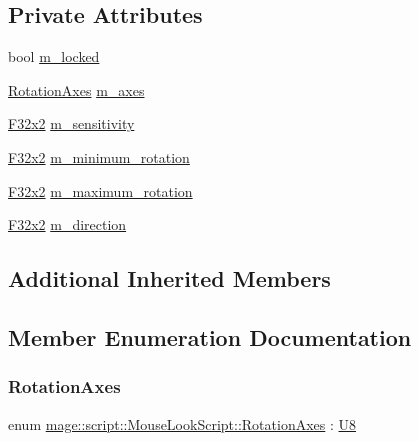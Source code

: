 \subsection*{Private Attributes}
\begin{DoxyCompactItemize}
\item 
bool \mbox{\hyperlink{classmage_1_1script_1_1_mouse_look_script_addf0b7af4f51cdd521c38d59233c04ce}{m\+\_\+locked}}
\item 
\mbox{\hyperlink{classmage_1_1script_1_1_mouse_look_script_a662018db64c5dc84a958eb1c6123a829}{Rotation\+Axes}} \mbox{\hyperlink{classmage_1_1script_1_1_mouse_look_script_ae41f05d545c70cd621a405f6ef0cd4d5}{m\+\_\+axes}}
\item 
\mbox{\hyperlink{namespacemage_aee4759dedc8def6c6dec26b5c7eddf29}{F32x2}} \mbox{\hyperlink{classmage_1_1script_1_1_mouse_look_script_afe7a443c1fa56fc6143555f992458934}{m\+\_\+sensitivity}}
\item 
\mbox{\hyperlink{namespacemage_aee4759dedc8def6c6dec26b5c7eddf29}{F32x2}} \mbox{\hyperlink{classmage_1_1script_1_1_mouse_look_script_a4379e58bd89eab39d3e281133968a959}{m\+\_\+minimum\+\_\+rotation}}
\item 
\mbox{\hyperlink{namespacemage_aee4759dedc8def6c6dec26b5c7eddf29}{F32x2}} \mbox{\hyperlink{classmage_1_1script_1_1_mouse_look_script_ac3c7af839d88b3d9ec65250c41099c34}{m\+\_\+maximum\+\_\+rotation}}
\item 
\mbox{\hyperlink{namespacemage_aee4759dedc8def6c6dec26b5c7eddf29}{F32x2}} \mbox{\hyperlink{classmage_1_1script_1_1_mouse_look_script_a5f65024afe8940ca2709d5ee13dc033c}{m\+\_\+direction}}
\end{DoxyCompactItemize}
\subsection*{Additional Inherited Members}


\subsection{Member Enumeration Documentation}
\mbox{\label{classmage_1_1script_1_1_mouse_look_script_a662018db64c5dc84a958eb1c6123a829}} 
\subsubsection{\texorpdfstring{Rotation\+Axes}{RotationAxes}}
{\footnotesize\ttfamily enum \mbox{\hyperlink{classmage_1_1script_1_1_mouse_look_script_a662018db64c5dc84a958eb1c6123a829}{mage\+::script\+::\+Mouse\+Look\+Script\+::\+Rotation\+Axes}} \+: \mbox{\hyperlink{namespacemage_a30677c03d683c4c35630c25f6ff3fb7f}{U8}}\hspace{0.3cm}{\ttfamily [strong]}}

